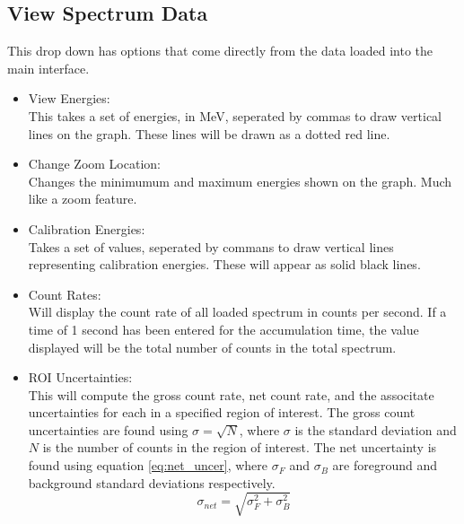 \subsection{View Spectrum Data}
	This drop down has options that come directly from the data loaded into the main interface. 

	\begin{itemize}
		\item View Energies:\\
			This takes a set of energies, in MeV, seperated by commas to draw vertical lines on the graph. These lines will be drawn as a dotted red line.
		\item Change Zoom Location:\\
			Changes the minimumum and maximum energies shown on the graph. Much like a zoom feature. 
		\item Calibration Energies:\\
			Takes a set of values, seperated by commans to draw vertical lines representing calibration energies. These will appear as solid black lines. 
		\item Count Rates:\\
			Will display the count rate of all loaded spectrum in counts per second. If a time of 1 second has been entered for the accumulation time, the value displayed will be the total number of counts in the total spectrum.
		\item ROI Uncertainties:\\
		This will compute the gross count rate, net count rate, and the associtate uncertainties for each in a specified region of interest. The gross count uncertainties are found using $\sigma=\sqrt{N}$, where $\sigma$ is the standard deviation and $N$ is the number of counts in the region of interest. The net uncertainty is found using equation \ref{eq:net_uncer}, where $\sigma_F$ and $\sigma_B$ are foreground and background standard deviations respectively.
		\begin{equation}
			\sigma_{net}=\sqrt{\sigma_F^2+\sigma_B^2}
			\label{eq:net_uncer}
		\end{equation}
	\end{itemize}